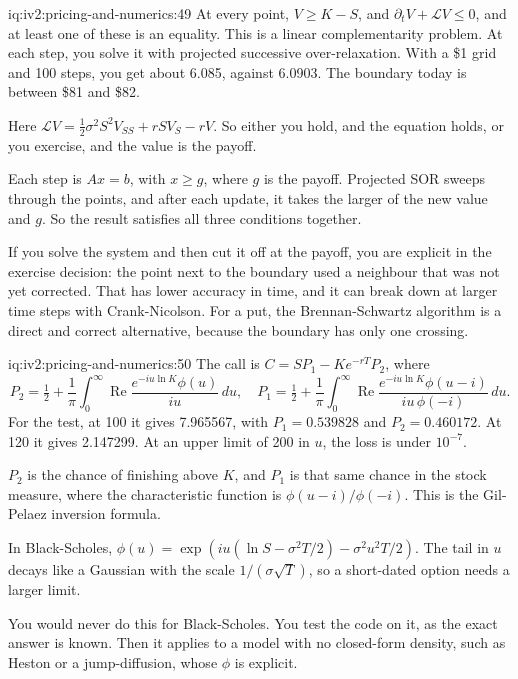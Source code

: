 \begin{solution}{iq:iv2:pricing-and-numerics:49}
At every point, $V \geq K - S$, and $\partial_tV + \mathcal LV \leq 0$, and at least one of these is an equality. This is a linear complementarity problem. At each step, you solve it with projected successive over-relaxation. With a \$1 grid and 100 steps, you get about 6.085, against 6.0903. The boundary today is between \$81 and \$82.

Here $\mathcal LV = \tfrac12\sigma^2S^2V_{SS} + rSV_S - rV$. So either you hold, and the equation holds, or you exercise, and the value is the payoff.

Each step is $Ax = b$, with $x \geq g$, where $g$ is the payoff. Projected SOR sweeps through the points, and after each update, it takes the larger of the new value and $g$. So the result satisfies all three conditions together.

If you solve the system and then cut it off at the payoff, you are explicit in the exercise decision: the point next to the boundary used a neighbour that was not yet corrected. That has lower accuracy in time, and it can break down at larger time steps with Crank-Nicolson. For a put, the Brennan-Schwartz algorithm is a direct and correct alternative, because the boundary has only one crossing.

\end{solution}

\begin{solution}{iq:iv2:pricing-and-numerics:50}
The call is $C = SP_1 - Ke^{-rT}P_2$, where
\[
P_2 = \tfrac12 + \frac1\pi\int_0^\infty\operatorname{Re}\frac{e^{-iu\ln K}\phi(u)}{iu}\,du, \quad
P_1 = \tfrac12 + \frac1\pi\int_0^\infty\operatorname{Re}\frac{e^{-iu\ln K}\phi(u - i)}{iu\,\phi(-i)}\,du.
\]
For the test, at 100 it gives 7.965567, with $P_1 = 0.539828$ and $P_2 = 0.460172$. At 120 it gives 2.147299. At an upper limit of 200 in $u$, the loss is under $10^{-7}$.

$P_2$ is the chance of finishing above $K$, and $P_1$ is that same chance in the stock measure, where the characteristic function is $\phi(u - i)/\phi(-i)$. This is the Gil-Pelaez inversion formula.

In Black-Scholes, $\phi(u) = \exp(iu(\ln S - \sigma^2T/2) - \sigma^2u^2T/2)$. The tail in $u$ decays like a Gaussian with the scale $1/(\sigma\sqrt T)$, so a short-dated option needs a larger limit.

You would never do this for Black-Scholes. You test the code on it, as the exact answer is known. Then it applies to a model with no closed-form density, such as Heston or a jump-diffusion, whose $\phi$ is explicit.

\end{solution}
